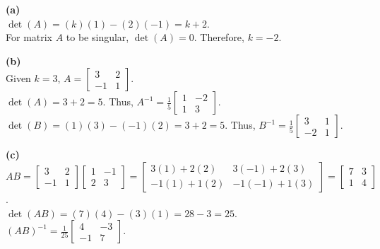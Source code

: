 \begin{solution}
\textbf{(a)} \\
$\det(A) = (k)(1) - (2)(-1) = k + 2$. \\
For matrix $A$ to be singular, $\det(A) = 0$. Therefore, $k = -2$.

\medskip
\textbf{(b)} \\
Given $k = 3$, $A = \begin{bmatrix} 3 & 2 \\ -1 & 1 \end{bmatrix}$. \\
$\det(A) = 3 + 2 = 5$. Thus, $A^{-1} = \frac{1}{5}\begin{bmatrix} 1 & -2 \\ 1 & 3 \end{bmatrix}$. \\
$\det(B) = (1)(3) - (-1)(2) = 3 + 2 = 5$. Thus, $B^{-1} = \frac{1}{5}\begin{bmatrix} 3 & 1 \\ -2 & 1 \end{bmatrix}$.

\medskip
\textbf{(c)} \\
$AB = \begin{bmatrix} 3 & 2 \\ -1 & 1 \end{bmatrix} \begin{bmatrix} 1 & -1 \\ 2 & 3 \end{bmatrix} = \begin{bmatrix} 3(1)+2(2) & 3(-1)+2(3) \\ -1(1)+1(2) & -1(-1)+1(3) \end{bmatrix} = \begin{bmatrix} 7 & 3 \\ 1 & 4 \end{bmatrix}$. \\
$\det(AB) = (7)(4) - (3)(1) = 28 - 3 = 25$. \\
$(AB)^{-1} = \frac{1}{25}\begin{bmatrix} 4 & -3 \\ -1 & 7 \end{bmatrix}$.


\end{solution}
